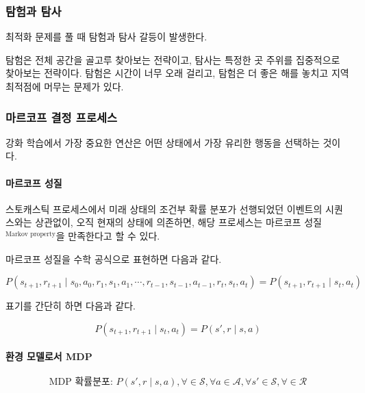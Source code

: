 \documentclass [12pt] {oblivoir}
\let\oldsubsubsection=\subsubsection
\renewcommand{\subsubsection}
{
  \filbreak
  \oldsubsubsection
}
\begin{document}
\vspace{3mm}

\subsubsection{탐험과 탐사}

최적화 문제를 풀 때 탐험과 탐사 갈등이 발생한다.

탐험은 전체 공간을 골고루 찾아보는 전략이고, 탐사는 특정한 곳 주위를 집중적으로 찾아보는 전략이다. 탐험은 시간이 너무 오래 걸리고, 탐험은 더 좋은 해를 놓치고 지역 최적점에 머무는 문제가 있다.

\subsubsection{마르코프 결정 프로세스}

강화 학습에서 가장 중요한 연산은 어떤 상태에서 가장 유리한 행동을 선택하는 것이다.

\paragraph*{마르코프 성질}\mbox{}

스토캐스틱 프로세스에서 미래 상태의 조건부 확률 분포가 선행되었던 이벤트의 시퀀스와는 상관없이, 오직 현재의 상태에 의존하면, 해당 프로세스는 마르코프 성질$^{\text{Markov property}}$을 만족한다고 할 수 있다.

마르코프 성질을 수학 공식으로 표현하면 다음과 같다.

\begin{equation} \tag{9.2}
  P(s_{t+1}, r_{t+1} \mid s_{0}, a_{0}, r_{1}, s_{1}, a_{1}, \cdots, r_{t-1}, s_{t-1}, a_{t-1}, r_{t}, s_{t}, a_{t}) = P(s_{t+1}, r_{t+1} \mid s_{t}, a_{t})
\end{equation}

표기를 간단히 하면 다음과 같다.

\begin{equation} \tag{9.3}
  P(s_{t+1}, r_{t+1} \mid s_{t}, a_{t}) = P(s', r \mid s, a)
\end{equation}

\vspace{3mm}

\paragraph*{환경 모델로서 MDP}\mbox{}

\begin{equation} \tag{9.4}
  \text{MDP 확률분포: } P(s',r \mid s, a), \forall \in \mathcal{S}, \forall a \in \mathcal{A}, \forall s' \in \mathcal{S}, \forall \in \mathcal{R}
\end{equation}
\end{document}
